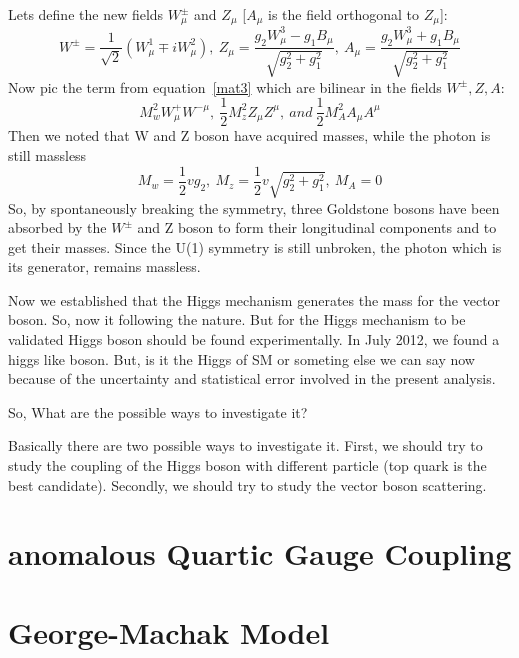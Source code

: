 Lets define the new fields $W^{\pm}_\mu$ and $Z_\mu$ [$A_\mu$ is the field orthogonal to $Z_\mu$]:
\begin{equation}
    W^{\pm}=\frac{1}{\sqrt{2}}(W^1_\mu \mp iW^2_\mu),~Z_\mu=\frac{g_2W^3_\mu-g_1B_\mu}{\sqrt{g^2_2+g^2_1}},~A_\mu=\frac{g_2W^3_\mu+g_1B_\mu}{\sqrt{g^2_2+g^2_1}}
\end{equation}
Now pic the term from equation~\ref{mat3} which are bilinear in the fields $W^\pm,Z,A$:
\begin{equation}
    M^2_wW^+_\mu W^{-\mu},~\frac{1}{2}M^2_z Z_\mu Z^\mu,~and~\frac{1}{2}M^2_AA_\mu A^\mu
\end{equation}
Then we noted that W and Z boson have acquired masses, while the photon is still massless
\begin{equation}
    M_w=\frac{1}{2}vg_2,~M_z=\frac{1}{2}v\sqrt{g^2_2+g^2_1},~M_A=0
\end{equation}
So, by spontaneously breaking the symmetry, three Goldstone bosons have been absorbed by the $W^{\pm}$ and Z boson to form their longitudinal components and to get their masses. Since the U(1) symmetry is still unbroken, the photon which is its generator, remains massless.


Now we established that the Higgs mechanism generates the mass for the vector boson. So, now it following the nature. But for the Higgs mechanism to be validated Higgs boson should be found experimentally. In July 2012, we found a higgs like boson. But, is it the Higgs of SM or someting else we can say now because of the uncertainty and statistical error involved in the present analysis. 

So, What are the possible ways to investigate it?

Basically there are two possible ways to investigate it. First, we should try to study the coupling of the Higgs boson with different particle (top quark is the best candidate). Secondly, we should try to study the vector boson scattering.


\section{anomalous Quartic Gauge Coupling} %
\label{sec:anomalous_quartic_gauge_coupling}


\section{George-Machak Model} %
\label{sec:george_machak_model}

